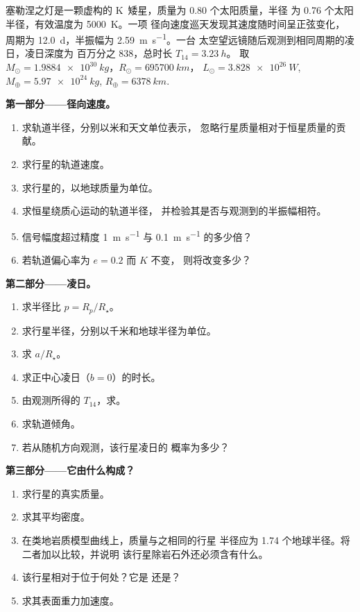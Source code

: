 \begin{problem}
\label{pb:b3:exoplanets:1}
塞勒涅之灯是一颗虚构的 K~矮星，质量为 0.80 个太阳质量，半径
为 0.76 个太阳半径，有效温度为 \qty{5000}{K}。一项
径向速度巡天发现其速度随时间呈正弦变化，
周期为 \qty{12.0}{d}，半振幅为 \qty{2.59}{m.s^{-1}}。一台
太空望远镜随后观测到相同周期的凌日，凌日深度为
百万分之 \num{838}，总时长 $T_{14} = \qty{3.23}{h}$。
取 $M_\odot = \qty{1.9884e30}{kg}$，$R_\odot = \qty{695700}{km}$，
$L_\odot = \qty{3.828e26}{W}$, $M_\oplus = \qty{5.97e24}{kg}$,
$R_\oplus = \qty{6378}{km}$.

\medskip\noindent\textbf{第一部分——径向速度。}
\begin{enumerate}
\item 求轨道半径，分别以米和天文单位表示，
  忽略行星质量相对于恒星质量的贡献。
\item 求行星的轨道速度。
\item 求行星的，以地球质量为单位。
\item 求恒星绕质心运动的轨道半径，
  并检验其是否与观测到的半振幅相符。
\item 信号幅度超过精度
  \qty{1}{m.s^{-1}} 与 \qty{0.1}{m.s^{-1}} 的多少倍？
\item 若轨道偏心率为 $e = 0.2$ 而 $K$ 不变，
  则将改变多少？
\end{enumerate}

\medskip\noindent\textbf{第二部分——凌日。}
\begin{enumerate}[resume]
\item 求半径比 $p = R_p/R_\star$。
\item 求行星半径，分别以千米和地球半径为单位。
\item 求 $a/R_\star$。
\item 求正中心凌日（$b = 0$）的时长。
\item 由观测所得的 $T_{14}$，求。
\item 求轨道倾角。
\item 若从随机方向观测，该行星凌日的
  概率为多少？
\end{enumerate}

\medskip\noindent\textbf{第三部分——它由什么构成？}
\begin{enumerate}[resume]
\item 求行星的真实质量。
\item 求其平均密度。
\item 在类地岩质模型曲线上，质量与之相同的行星
  半径应为 1.74 个地球半径。将二者加以比较，并说明
  该行星除岩石外还必须含有什么。
\item 该行星相对于位于何处？它是
  还是？
\item 求其表面重力加速度。
\end{enumerate}


\end{problem}

